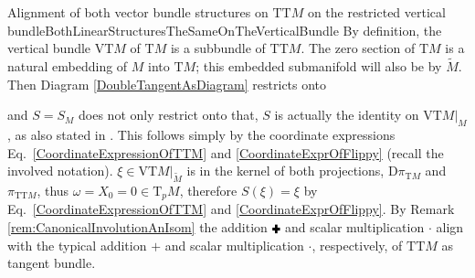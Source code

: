 \documentclass[a4paper,oneside,11pt,bibliography=totoc]{scrartcl}
\def\RPlus{\ensuremath{\mathbin{\rule[.13em]{.66em}{.22em}\hspace{-.44em}\rule[-.08em]{.22em}{.66em}\,}}} %
\theoremstyle{plain}
\theoremstyle{remark}
\theoremstyle{definition}
\begin{document}
\begin{remarks}{Alignment of both vector bundle structures on $\mathrm{TT}M$ on the restricted vertical bundle}{BothLinearStructuresTheSameOnTheVerticalBundle}
By definition, the vertical bundle $\mathrm{VT}M$ of $\mathrm{T}M$ is a subbundle of $\mathrm{TT}M$. The zero section of $\mathrm{T}M$ is a natural embedding of $M$ into $\mathrm{T}M$; this embedded submanifold will also be by $\widetilde{M}$. Then Diagram \eqref{DoubleTangentAsDiagram} restricts onto
\begin{center}
\end{center} 
and $S=S_M$ does not only restrict onto that, $S$ is actually the identity on $\mathrm{VT}M|_M$, as also stated in \cite[\S 9.6, Thm.\ 9.6.1, page 363; but without proof]{mackenzieGeneralTheory}. This follows simply by the coordinate expressions Eq.\ \eqref{CoordinateExpressionOfTTM} and \eqref{CoordinateExprOfFlippy} (recall the involved notation). $\xi \in \mathrm{VT}M|_{\widetilde{M}}$ is in the kernel of both projections, $\mathrm{D}\pi_{\mathrm{T}M}$ and $\pi_{\mathrm{TT}M}$, thus $\omega = X_0 = 0 \in \mathrm{T}_pM$, therefore $S(\xi) = \xi$ by Eq.\ \eqref{CoordinateExpressionOfTTM} and \eqref{CoordinateExprOfFlippy}. By Remark \ref{rem:CanonicalInvolutionAnIsom} the addition $\RPlus$ and scalar multiplication $\boldsymbol{\cdot}$ align with the typical addition $+$ and scalar multiplication $\cdot$, respectively, of $\mathrm{TT}M$ as tangent bundle.


\end{remarks}
\end{document}
